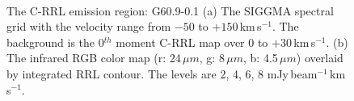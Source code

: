 \documentclass[manuscript]{aastex61}
\newcommand{\kms}{\,km\,s$^{-1}$}
\newcommand{\um}{\mu m}
\begin{document}
\begin{figure}[H]
	\centering
	\\ 
	\caption{The C-RRL emission region: G60.9-0.1
	(a) The SIGGMA spectral grid with the velocity range from $-50$ to $+150$\kms.
	The background is the 0$^{th}$ moment C-RRL map over $0$ to $+30$\kms.
	(b) The infrared RGB color map (r: 24\,$\um$, g: 8\,$\um$, b: 4.5\,$\um$) overlaid by integrated RRL contour.
	The levels are 2, 4, 6, 8 mJy\,beam$^{-1}$\kms.}
	\label{fig_crrl-g609}
\end{figure}
\end{document}
